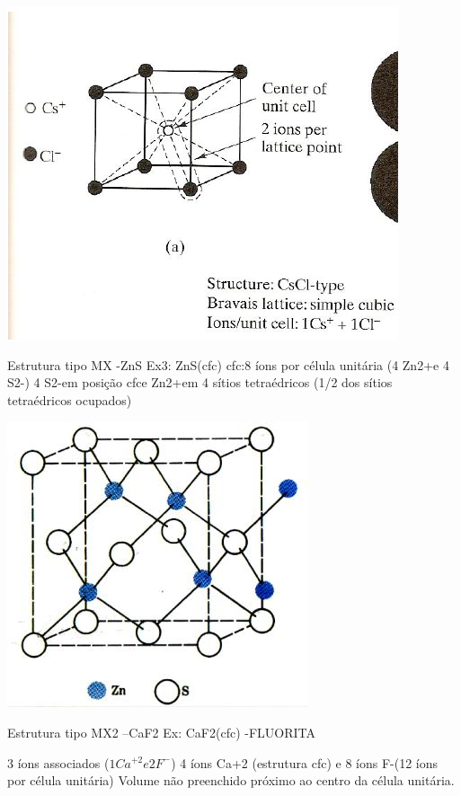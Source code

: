  \includegraphics[scale=0.2,trim={0 0 0 0}]{figures/CsCl}
 
 

Estrutura tipo MX -ZnS
Ex3: ZnS(cfc)
cfc:8 íons por célula unitária (4 Zn2+e 4 S2-)
4 S2-em posição cfce Zn2+em 4 sítios tetraédricos
(1/2 dos sítios tetraédricos ocupados)

 \includegraphics[scale=0.3,trim={0 0 0 0}]{figures/ZnS}


 Estrutura tipo MX2 –CaF2
 Ex: CaF2(cfc) -FLUORITA
 
3 íons associados ($1Ca^{+2} e 2F^{-}$)
4 íons Ca+2 (estrutura cfc) e 8 íons F-(12 íons por célula unitária)
Volume não preenchido próximo ao centro da célula unitária.

